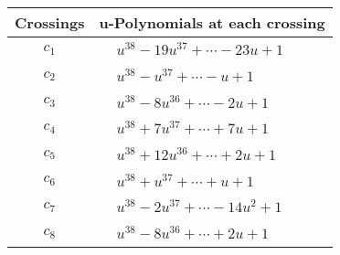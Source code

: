 \documentclass[1p]{elsarticle_modified}
\theoremstyle{definition}
\begin{document}
\begin{tabular}{m{50pt}|m{274pt}}
Crossings & \hspace{64pt}u-Polynomials at each crossing \\
\hline $$\begin{aligned}c_{1}\end{aligned}$$&$\begin{aligned}
&u^{38}-19 u^{37}+\cdots-23 u+1
\end{aligned}$\\
\hline $$\begin{aligned}c_{2}\end{aligned}$$&$\begin{aligned}
&u^{38}- u^{37}+\cdots- u+1
\end{aligned}$\\
\hline $$\begin{aligned}c_{3}\end{aligned}$$&$\begin{aligned}
&u^{38}-8 u^{36}+\cdots-2 u+1
\end{aligned}$\\
\hline $$\begin{aligned}c_{4}\end{aligned}$$&$\begin{aligned}
&u^{38}+7 u^{37}+\cdots+7 u+1
\end{aligned}$\\
\hline $$\begin{aligned}c_{5}\end{aligned}$$&$\begin{aligned}
&u^{38}+12 u^{36}+\cdots+2 u+1
\end{aligned}$\\
\hline $$\begin{aligned}c_{6}\end{aligned}$$&$\begin{aligned}
&u^{38}+u^{37}+\cdots+u+1
\end{aligned}$\\
\hline $$\begin{aligned}c_{7}\end{aligned}$$&$\begin{aligned}
&u^{38}-2 u^{37}+\cdots-14 u^2+1
\end{aligned}$\\
\hline $$\begin{aligned}c_{8}\end{aligned}$$&$\begin{aligned}
&u^{38}-8 u^{36}+\cdots+2 u+1
\end{aligned}$\\

\end{tabular}
\end{document}
